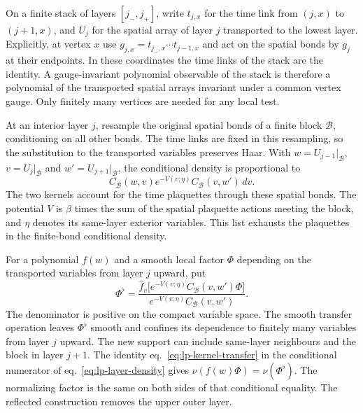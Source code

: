 \documentclass[11pt,letterpaper,reqno]{amsart}
\numberwithin{equation}{section}
\renewcommand{\eqref}[1]{\textup{eq.~\ref{#1}}}
\theoremstyle{definition}
\theoremstyle{remark}
\begin{document}
On a finite stack of layers \([j_-,j_+]\), write \(t_{j,x}\) for
the time link from \((j,x)\) to \((j+1,x)\), and \(U_j\) for
the spatial array of layer \(j\) transported to the lowest layer.
Explicitly, at vertex \(x\) use
\(g_{j,x}=t_{j_-,x}\cdots t_{j-1,x}\) and act on the spatial
bonds by \(g_j\) at their endpoints. In these coordinates the
time links of the stack are the identity. A gauge-invariant
polynomial observable of the stack is therefore a polynomial of
the transported spatial arrays invariant under a common vertex
gauge. Only finitely many vertices are needed for any local test.

At an interior layer \(j\), resample the original spatial bonds
of a finite block \(\mathcal B\), conditioning on all other bonds.
The time links are fixed in this resampling, so the substitution
to the transported variables preserves Haar. With
\(w=U_{j-1}|_{\mathcal B}\), \(v=U_j|_{\mathcal B}\) and
\(w'=U_{j+1}|_{\mathcal B}\), the conditional density is proportional to
\begin{equation}\label{eq:lp-layer-density}
        C_{\mathcal B}(w,v)e^{-V(v;\eta)}
                         C_{\mathcal B}(v,w')\,dv .
\end{equation}
The two kernels account for the time plaquettes through these
spatial bonds. The potential \(V\) is \(\beta\) times the sum of
the spatial plaquette actions meeting the block, and \(\eta\)
denotes its same-layer exterior variables. This list exhausts
the plaquettes in the finite-bond conditional density.

For a polynomial \(f(w)\) and a smooth local factor \(\Phi\)
depending on the transported variables from layer \(j\) upward,
put
\begin{equation}\label{eq:lp-single-elimination}
 \Phi^\flat=
 \frac{\widehat f_v\bigl[e^{-V(v;\eta)}C_{\mathcal B}(v,w')\Phi\bigr]}
      {e^{-V(v;\eta)}C_{\mathcal B}(v,w')}.
\end{equation}
The denominator is positive on the compact variable space.
The smooth transfer operation leaves \(\Phi^\flat\) smooth and
confines its dependence to finitely many variables from layer
\(j\) upward. The new support can include same-layer neighbours and
the block in layer \(j+1\). The identity \eqref{eq:lp-kernel-transfer}
in the conditional numerator of \eqref{eq:lp-layer-density}
gives \(\nu(f(w)\Phi)=\nu(\Phi^\flat)\). The normalizing factor
is the same on both sides of that conditional equality. The
reflected construction removes the upper outer layer.
\end{document}
